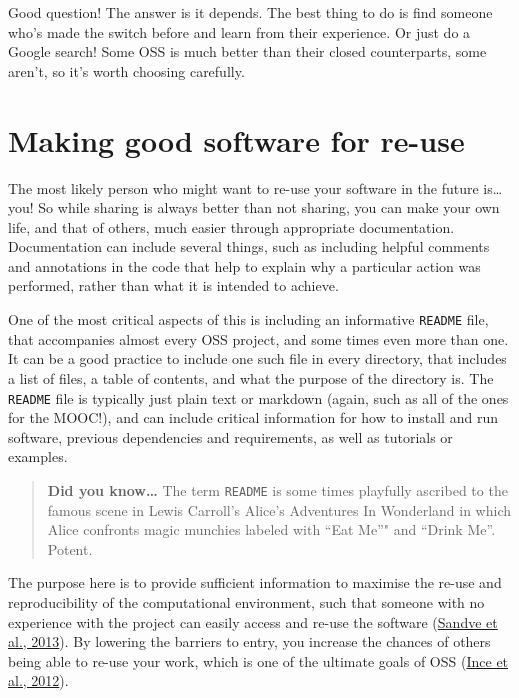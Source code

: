 \documentclass[]{book}
\begin{document}
Good question! The answer is it depends. The best thing to do is find someone who's made the switch before and learn from their experience. Or just do a Google search! Some OSS is much better than their closed counterparts, some aren't, so it's worth choosing carefully.

\hypertarget{making-good-software-for-re-use}{%
\section{Making good software for re-use }\label{making-good-software-for-re-use}}

The most likely person who might want to re-use your software in the future is\ldots{}you! So while sharing is always better than not sharing, you can make your own life, and that of others, much easier through appropriate documentation. Documentation can include several things, such as including helpful comments and annotations in the code that help to explain why a particular action was performed, rather than what it is intended to achieve.

One of the most critical aspects of this is including an informative \texttt{README} file, that accompanies almost every OSS project, and some times even more than one. It can be a good practice to include one such file in every directory, that includes a list of files, a table of contents, and what the purpose of the directory is. The \texttt{README} file is typically just plain text or markdown (again, such as all of the ones for the MOOC!), and can include critical information for how to install and run software, previous dependencies and requirements, as well as tutorials or examples.

\begin{quote}
\textbf{Did you know\ldots{}} The term \texttt{README} is some times playfully ascribed to the famous scene in Lewis Carroll's Alice's Adventures In Wonderland in which Alice confronts magic munchies labeled with ``Eat Me''" and ``Drink Me''. Potent.
\end{quote}

The purpose here is to provide sufficient information to maximise the re-use and reproducibility of the computational environment, such that someone with no experience with the project can easily access and re-use the software (\href{https://github.com/OpenScienceMOOC/Module-5-Open-Research-Software-and-Open-Source/blob/master/Reading\%20Material_Open\%20Source\%20and\%20Open\%20Research\%20Software/Sandve\%20et\%20al.\%2C\%202013.PDF}{Sandve et al., 2013}). By lowering the barriers to entry, you increase the chances of others being able to re-use your work, which is one of the ultimate goals of OSS (\href{https://github.com/OpenScienceMOOC/Module-5-Open-Research-Software-and-Open-Source/blob/master/Reading\%20Material_Open\%20Source\%20and\%20Open\%20Research\%20Software/Ince\%20et\%20al.\%2C\%202012.pdf}{Ince et al., 2012}).
\end{document}
